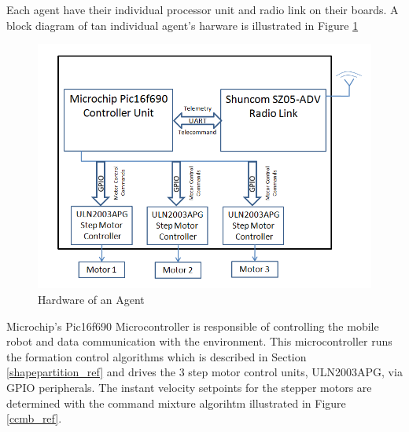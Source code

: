 Each agent have their individual processor unit and radio link on their boards. A block diagram of tan individual agent's harware is illustrated in Figure \ref{indhardware_ref}
		
\begin{figure}[H]
\caption{Hardware of an Agent} \label{indhardware_ref}
\centerline{\includegraphics[scale = 0.70]{agent}}
\end{figure} 
		
Microchip's Pic16f690 Microcontroller is responsible of controlling the mobile robot and data communication with the environment. This microcontroller runs the formation control algorithms which is described in Section \ref{shapepartition_ref} and drives the 3 step motor control units, ULN2003APG, via GPIO peripherals. The instant velocity setpoints for the stepper motors  are determined with the command mixture algorihtm illustrated in Figure \ref{ccmb_ref}.
		
